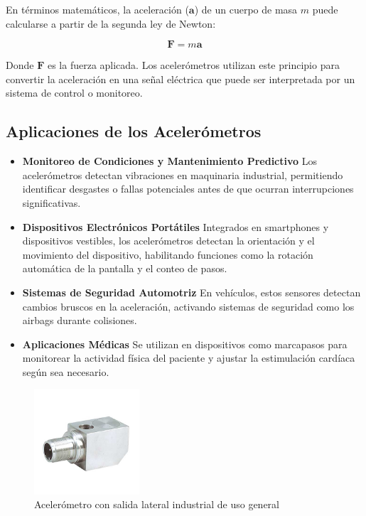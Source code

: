 \documentclass{article}
\begin{document}
	En términos matemáticos, la aceleración (\(\mathbf{a}\)) de un cuerpo de masa \(m\) puede calcularse a partir de la segunda ley de Newton:
	
	\[
	\mathbf{F} = m \mathbf{a}
	\]
	
	Donde \(\mathbf{F}\) es la fuerza aplicada. Los acelerómetros utilizan este principio para convertir la aceleración en una señal eléctrica que puede ser interpretada por un sistema de control o monitoreo.
	
	\subsection{Aplicaciones de los Acelerómetros}
	\begin{itemize}
	\item \textbf{Monitoreo de Condiciones y Mantenimiento Predictivo}
	Los acelerómetros detectan vibraciones en maquinaria industrial, permitiendo identificar desgastes o fallas potenciales antes de que ocurran interrupciones significativas.
	
	\item \textbf{Dispositivos Electrónicos Portátiles}
	Integrados en smartphones y dispositivos vestibles, los acelerómetros detectan la orientación y el movimiento del dispositivo, habilitando funciones como la rotación automática de la pantalla y el conteo de pasos.
	
	\item \textbf{Sistemas de Seguridad Automotriz}
	En vehículos, estos sensores detectan cambios bruscos en la aceleración, activando sistemas de seguridad como los airbags durante colisiones.
	
	\item \textbf{Aplicaciones Médicas}
	Se utilizan en dispositivos como marcapasos para monitorear la actividad física del paciente y ajustar la estimulación cardíaca según sea necesario.
		\end{itemize}
		\begin{figure}[H]
		\centering
		\includegraphics[width=0.35\textwidth]{acelerometro.jpg}
		\caption{Acelerómetro con salida lateral industrial de uso general}
	\end{figure}
	
\end{document}

